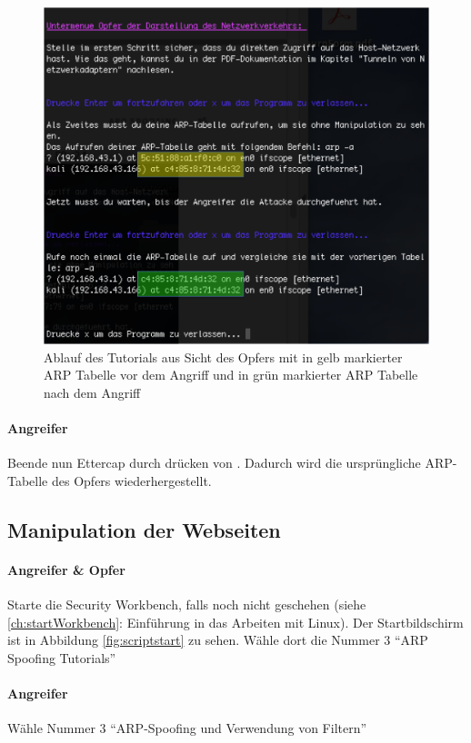  \begin{figure}
	\centering
	\includegraphics[width=\textwidth]{images/arp/NetzwerkverkehrOpfer}
	\caption{Ablauf des Tutorials aus Sicht des Opfers mit in gelb markierter ARP Tabelle vor dem Angriff und in grün markierter ARP Tabelle nach dem Angriff}
	\label{fig:netzwerkverkehropfer}
\end{figure}

\paragraph{Angreifer} Beende nun Ettercap durch drücken von . Dadurch wird die ursprüngliche ARP-Tabelle des Opfers wiederhergestellt.

\subsection{Manipulation der Webseiten}
\paragraph{Angreifer \& Opfer} Starte die Security Workbench, falls noch nicht geschehen (siehe \ref{ch:startWorkbench}: Einführung in das Arbeiten mit Linux). Der Startbildschirm ist in Abbildung \ref{fig:scriptstart} zu sehen. Wähle dort die Nummer 3 \enquote{ARP Spoofing Tutorials}

\paragraph{Angreifer} Wähle Nummer 3 \enquote{ARP-Spoofing und Verwendung von Filtern}

